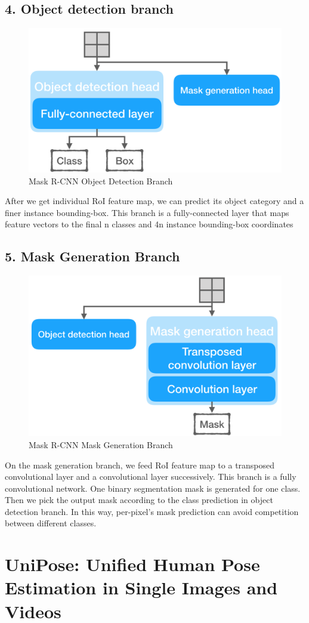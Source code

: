 \documentclass[a4paper]{report}
\begin{document}
\section*{4. Object detection branch}
\begin{figure}[h]
    \centering
    \includegraphics[width=0.4 \textwidth]{./entities/maskrcnn-object-detection-head.png}
    \caption{Mask R-CNN Object Detection Branch}
    \label{fig:RCNN_ODB}
\end{figure}
After we get individual RoI feature map, we can predict its object category and a finer instance bounding-box. This branch is a fully-connected layer that maps feature vectors to the final n classes and 4n instance bounding-box coordinates

\section*{5. Mask Generation Branch}
\begin{figure}[h]
    \centering
    \includegraphics[width=0.4 \textwidth]{./entities/maskrcnn-mask-head.png}
    \caption{Mask R-CNN Mask Generation Branch}
    \label{fig:RCNN_MGB}
\end{figure}
On the mask generation branch, we feed RoI feature map to a transposed convolutional layer and a convolutional layer successively. This branch is a fully convolutional network. One binary segmentation mask is generated for one class. Then we pick the output mask according to the class prediction in object detection branch. In this way, per-pixel's mask prediction can avoid competition between different classes.

\chapter*{UniPose: Unified Human Pose Estimation in Single Images and Videos}
\end{document}
